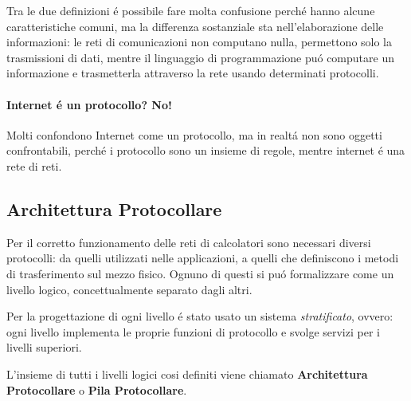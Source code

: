 \documentclass[12pt]{article}
\begin{document}
Tra le due definizioni \'e possibile fare molta confusione perch\'e hanno alcune caratteristiche comuni, ma la differenza 
sostanziale sta nell'elaborazione delle informazioni: le reti di comunicazioni non computano nulla, permettono solo la 
trasmissioni di dati, mentre il linguaggio di programmazione pu\'o computare un informazione e trasmetterla attraverso la rete 
usando determinati protocolli.

\paragraph{Internet \'e un protocollo? No!} Molti confondono Internet come un protocollo, ma in realt\'a non sono oggetti
confrontabili, perch\'e i protocollo sono un insieme di regole, mentre internet \'e una rete di reti.

\clearpage

\subsection{Architettura Protocollare}\label{architettura-protocollare}
Per il corretto funzionamento delle reti di calcolatori sono necessari diversi protocolli: da quelli utilizzati nelle 
applicazioni, a quelli che definiscono i metodi di trasferimento sul mezzo fisico. Ognuno di questi si pu\'o formalizzare come 
un livello logico, concettualmente separato dagli altri. 

Per la progettazione di ogni livello \'e stato usato un sistema \textit{stratificato}, ovvero: ogni livello implementa le 
proprie funzioni di protocollo e svolge servizi per i livelli superiori.

L'insieme di tutti i livelli logici cosi definiti viene chiamato \textbf{Architettura Protocollare} o \textbf{Pila 
Protocollare}.
\end{document}
